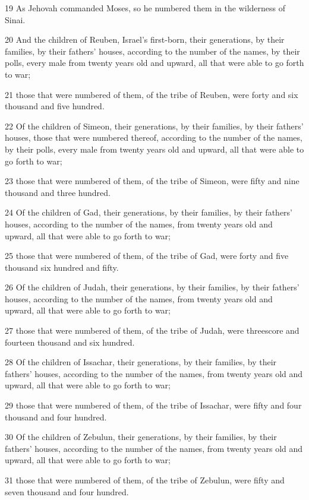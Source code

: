 \par 19 As Jehovah commanded Moses, so he numbered them in the wilderness of Sinai.
\par 20 And the children of Reuben, Israel's first-born, their generations, by their families, by their fathers' houses, according to the number of the names, by their polls, every male from twenty years old and upward, all that were able to go forth to war;
\par 21 those that were numbered of them, of the tribe of Reuben, were forty and six thousand and five hundred.
\par 22 Of the children of Simeon, their generations, by their families, by their fathers' houses, those that were numbered thereof, according to the number of the names, by their polls, every male from twenty years old and upward, all that were able to go forth to war;
\par 23 those that were numbered of them, of the tribe of Simeon, were fifty and nine thousand and three hundred.
\par 24 Of the children of Gad, their generations, by their families, by their fathers' houses, according to the number of the names, from twenty years old and upward, all that were able to go forth to war;
\par 25 those that were numbered of them, of the tribe of Gad, were forty and five thousand six hundred and fifty.
\par 26 Of the children of Judah, their generations, by their families, by their fathers' houses, according to the number of the names, from twenty years old and upward, all that were able to go forth to war;
\par 27 those that were numbered of them, of the tribe of Judah, were threescore and fourteen thousand and six hundred.
\par 28 Of the children of Issachar, their generations, by their families, by their fathers' houses, according to the number of the names, from twenty years old and upward, all that were able to go forth to war;
\par 29 those that were numbered of them, of the tribe of Issachar, were fifty and four thousand and four hundred.
\par 30 Of the children of Zebulun, their generations, by their families, by their fathers' houses, according to the number of the names, from twenty years old and upward, all that were able to go forth to war;
\par 31 those that were numbered of them, of the tribe of Zebulun, were fifty and seven thousand and four hundred.
